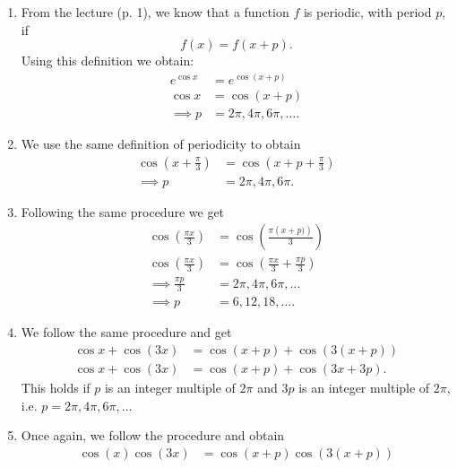 \begin{derivation}
  \begin{enumerate}[label=\alph*)]
    \item From the lecture (p. 1), we know that a function $f$ is periodic, with period $p$, if
      \begin{equation*}
        f(x) = f(x+p)
      .\end{equation*}
      Using this definition we obtain:
      \begin{align*}
        e^{\cos x} &= e^{\cos (x + p)} \\
        \cos x &= \cos \left( x + p \right) \\
        \implies p &= 2 \pi, 4\pi, 6\pi,\ldots 
      .\end{align*}
    \item We use the same definition of periodicity to obtain
      \begin{align*}
        \cos \left( x + \frac{\pi}{3} \right) &= \cos \left( x + p + \frac{\pi}{3} \right) \\
        \implies p &= 2 \pi, 4\pi, 6\pi
      .\end{align*}
    \item Following the same procedure we get
      \begin{align*}
        \cos \left( \frac{\pi x}{3} \right) &= \cos \left( \frac{\pi \left( x + p) \right)}{3} \right) \\
        \cos \left( \frac{\pi x}{3} \right) &= \cos \left( \frac{\pi x}{3} + \frac{\pi p}{3} \right) \\
        \implies \frac{\pi p}{3} &= 2\pi, 4\pi, 6\pi,\ldots  \\
        \implies p &= 6, 12, 18, \ldots 
      .\end{align*}
    \item We follow the same procedure and get
      \begin{align*}
        \cos x + \cos \left( 3x \right) &= \cos \left( x+p \right) + \cos \left( 3 (x+p) \right) \\
        \cos x + \cos (3x) &= \cos (x+p) + \cos \left( 3x + 3p \right)
      .\end{align*}
      This holds if $p$ is an integer multiple of $2 \pi$ and $3p$ is an integer multiple of $2\pi$, i.e. $p = 2\pi, 4\pi, 6\pi,\ldots $
    \item Once again, we follow the procedure and obtain
      \begin{align*}
        \cos (x) \cos (3x) &= \cos (x + p) \cos (3(x + p)) \\

\end{align*}
\end{enumerate}
\end{derivation}
